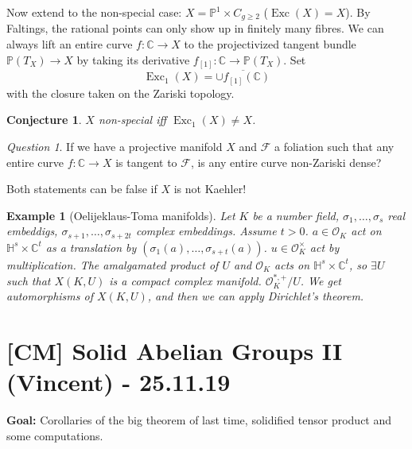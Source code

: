 \documentclass[12pt]{article}
\theoremstyle{darkgreentheorem}
\newtheorem{conj}[thm]{Conjecture}
\theoremstyle{darkbluedefinition}
\theoremstyle{darkredexample}
\newtheorem{exa}[thm]{Example}
\theoremstyle{remark}
\newtheorem{q}[thm]{Question}
\newcommand{\1}{\mathbbm{1}}
\newcommand{\C}{\mathbb{C}}
\renewcommand{\P}{\mathbb{P}}
\newcommand{\bbH}{\mathbb{H}}
\newcommand{\F}{\mathcal{F}}
\renewcommand{\O}{\mathcal{O}}
\DeclareMathOperator{\Exc}{Exc}
\newcommand{\db}{\marginnote{\dbend}}
\newcommand{\tms}{\times}
\begin{document}
Now extend to the non-special case: $X=\P^{1}\tms C_{g\geqslant 2}$ ($\Exc(X)=X$).
By Faltings, the rational points can only show up in finitely many fibres.
We can always lift an entire curve $f\colon \C\to X$ to the projectivized tangent bundle $\P(T_{X})\to X$ by taking its derivative $f_{[1]}\colon \C\to \P(T_{X})$.
Set
\[ \Exc_{1}(X)=\overline{\cup f_{[1]}(\C)} \]
with the closure taken on the Zariski topology.

\begin{conj}
    $X$ non-special iff $\Exc_{1}(X)\neq X$.
\end{conj}

\begin{q}
    If we have a projective manifold $X$ and $\F$ a foliation such that any entire curve $f\colon \C\to X$ is tangent to $\F$, is any entire curve non-Zariski dense?
\end{q}

\db Both statements can be false if $X$ is not Kaehler!

\begin{exa}[Oelijeklaus-Toma manifolds]
    Let $K$ be a number field, $\sigma_{1},\ldots,\sigma_{s}$ real embeddigs, $\sigma_{s+1},\ldots, \sigma_{s+2t}$ complex embeddings.
    Assume $t>0$.
    $a\in \O_{K}$ act on $\bbH^{s}\tms \C^{t}$ as a translation by $(\sigma_{1}(a),\ldots,\sigma_{s+t}(a))$.
    $u\in \O_{K}^{\tms}$ act by multiplication.
    The amalgamated product of $U$ and $\O_{K}$ acts on $\bbH^{s}\tms \C^{t}$, so $\exists U$ such that $X(K,U)$ is a compact complex manifold.
    $\O_{K}^{*,+}/U$.
    We get automorphisms of $X(K,U)$, and then we can apply Dirichlet's theorem.
\end{exa}

\section{[CM] Solid Abelian Groups II (Vincent) - 25.11.19}

\textbf{Goal:} Corollaries of the big theorem of last time, solidified tensor product and some computations.
\end{document}
